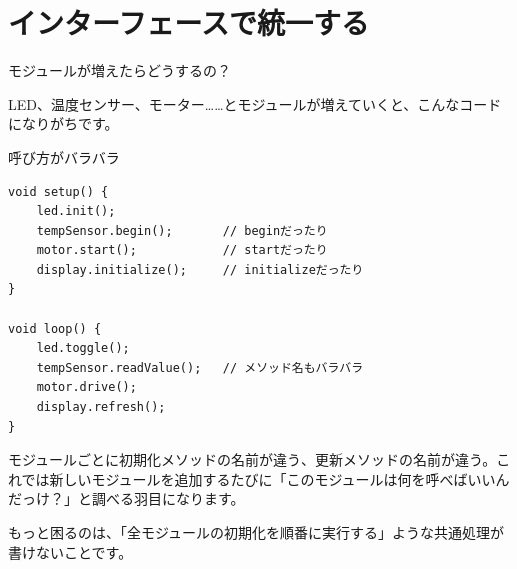 \section{インターフェースで統一する}

\begin{qabox}{モジュールが増えたらどうするの？}

LED、温度センサー、モーター……とモジュールが増えていくと、こんなコードになりがちです。

\begin{badexample}{呼び方がバラバラ}
\begin{lstlisting}
void setup() {
    led.init();
    tempSensor.begin();       // beginだったり
    motor.start();            // startだったり
    display.initialize();     // initializeだったり
}

void loop() {
    led.toggle();
    tempSensor.readValue();   // メソッド名もバラバラ
    motor.drive();
    display.refresh();
}
\end{lstlisting}
\end{badexample}

モジュールごとに初期化メソッドの名前が違う、更新メソッドの名前が違う。これでは新しいモジュールを追加するたびに「このモジュールは何を呼べばいいんだっけ？」と調べる羽目になります。

もっと困るのは、「全モジュールの初期化を順番に実行する」ような共通処理が書けないことです。

\end{qabox}

